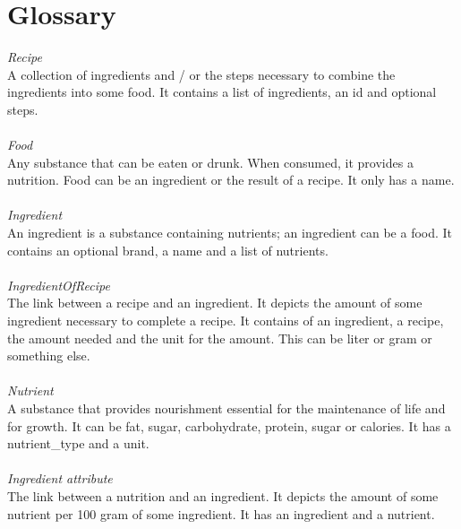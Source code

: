 \section{Glossary}
\textit{Recipe} \\
A collection of ingredients and /  or the steps necessary to combine the ingredients into some food. It contains a list of ingredients, an id and optional steps. \\ \\
\textit{Food} \\
Any substance that can be eaten or drunk. When consumed, it provides a nutrition. Food can be an ingredient or the result of a recipe. It only has a name. \\ \\
\textit{Ingredient} \\
An ingredient is a substance containing nutrients; an ingredient can be a food. It contains an optional brand, a name and a list of nutrients.  \\ \\
\textit{IngredientOfRecipe} \\
The link between a recipe and an ingredient. It depicts the amount of some ingredient necessary to complete a recipe. It contains of an ingredient, a recipe, the amount needed and the unit for the amount. This can be liter or gram or something else.\\ \\
\textit{Nutrient} \\
A substance that provides nourishment essential for the maintenance of life and for growth. It can be fat, sugar, carbohydrate, protein, sugar or calories. It has a nutrient\_type and a unit.  \\ \\
\textit{Ingredient attribute} \\
The link between a nutrition and an ingredient. It depicts the amount of some nutrient per 100 gram of some ingredient. It has an ingredient and a nutrient.\\ \\

